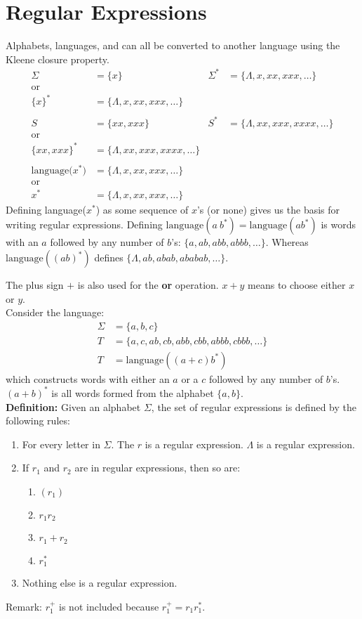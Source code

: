 \section{Regular Expressions}
Alphabets, languages, and  can all be converted to another language using the Kleene closure property.
\begin{align*}
    \Sigma&=\{x\} & \Sigma^*&= \{\Lambda,x,xx,xxx,\ldots\}\\
    \text{or}\\
    \{x\}^*&=\{\Lambda,x,xx,xxx,\ldots\} & &\\
    \\
    S&=\{xx,xxx\}   &   S^*&=\{\Lambda,xx,xxx,xxxx,\ldots\}\\
    \text{or}\\
    \{xx,xxx\}^*&= \{\Lambda,xx,xxx,xxxx,\ldots\} & &\\
    \\
    \text{language($x^*$)}&=\{\Lambda,x,xx,xxx,\ldots\} & &\\
    \text{or}\\
    x^*&=\{\Lambda,x,xx,xxx,\ldots\} & &
\end{align*}
Defining language(\(x^*\)) as some sequence of \(x\)'s (or none) gives us the basis for writing regular expressions.
Defining \(\text{language}(a\ b^*) = \text{language}(ab^*)\) is words with an \(a\) followed by any number of \(b\)'s: \(\{a,ab,abb,abbb,\ldots\}\).
Whereas \(\text{language}((ab)^*)\) defines \(\{\Lambda,ab,abab,ababab,\ldots\}\).

The plus sign \(+\) is also used for the \textbf{or} operation. \(x + y\) means to choose either \(x\) or \(y\).\\
Consider the language:
\begin{align*}
    \Sigma &=\{a,b,c\}\\
    T &=\{a,c,ab,cb,abb,cbb,abbb,cbbb,\ldots\}\\
    T &=\text{language}((a+c)b^*)
\end{align*}
which constructs words with either an \(a\) or a \(c\) followed by any number of \(b\)'s.
\\
\((a+b)^*\) is all words formed from the alphabet \(\{a,b\}\).
\\
\textbf{Definition:} Given an alphabet \(\Sigma\), the set of regular expressions is defined by the following rules:
\begin{enumerate}
    \item For every letter in \(\Sigma\). The \(r\) is a regular expression. \(\Lambda\) is a regular expression.
    \item If {\bf \(r_1\)} and {\(r_2\)} are in regular expressions, then so are:
    \begin{enumerate}
        \item \((r_1)\)
        \item \(r_1r_2\)
        \item \(r_1+r_2\)
        \item \(r_1^*\)
    \end{enumerate}
    \item Nothing else is a regular expression.
\end{enumerate}
Remark: \(r_1^+\) is not included because \(r_1^+=r_1r_1^*\).

